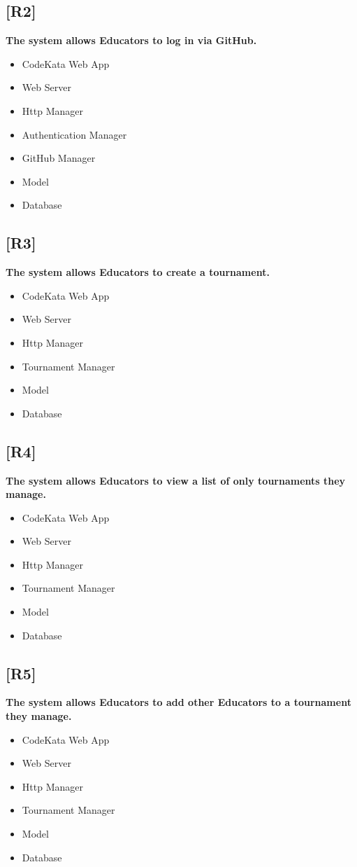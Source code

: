 \documentclass{article}
\begin{document}
\subsection{[R2]}
\textbf{ The system allows Educators to log in via GitHub.}
\begin{itemize}
\item CodeKata Web App
\item Web Server
\item Http Manager
\item Authentication Manager
\item GitHub Manager
\item Model
\item Database
\end{itemize}
\subsection{[R3]}
\textbf{ The system allows Educators to create a tournament.}
\begin{itemize}
\item CodeKata Web App
\item Web Server
\item Http Manager
\item Tournament Manager
\item Model
\item Database
\end{itemize}
\subsection{[R4]}
\textbf{ The system allows Educators to view a list of only tournaments they manage.}
\begin{itemize}
\item CodeKata Web App
\item Web Server
\item Http Manager
\item Tournament Manager
\item Model
\item Database
\end{itemize}
\subsection{[R5]}
\textbf{ The system allows Educators to add other Educators to a tournament they manage.}
\begin{itemize}
\item CodeKata Web App
\item Web Server
\item Http Manager
\item Tournament Manager
\item Model
\item Database
\end{itemize}
\end{document}
